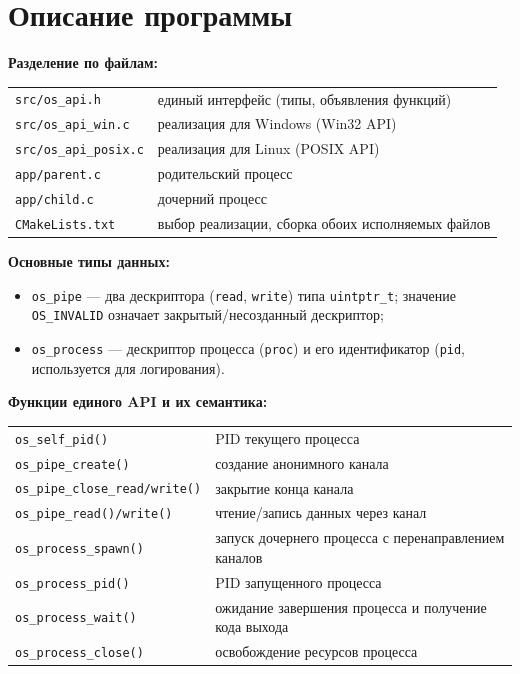 \section{Описание программы}

\textbf{Разделение по файлам:}

\begin{center}
\begin{tabular}{ll}
\texttt{src/os\_api.h}       & единый интерфейс (типы, объявления функций) \\
\texttt{src/os\_api\_win.c}  & реализация для Windows (Win32 API) \\
\texttt{src/os\_api\_posix.c}& реализация для Linux (POSIX API) \\
\texttt{app/parent.c}        & родительский процесс \\
\texttt{app/child.c}         & дочерний процесс \\
\texttt{CMakeLists.txt}      & выбор реализации, сборка обоих исполняемых файлов \\
\end{tabular}
\end{center}

\textbf{Основные типы данных:}
\begin{itemize}
  \item \texttt{os\_pipe} --- два дескриптора (\texttt{read}, \texttt{write}) типа
    \texttt{uintptr\_t}; значение \texttt{OS\_INVALID} означает закрытый/несозданный дескриптор;
  \item \texttt{os\_process} --- дескриптор процесса (\texttt{proc}) и его идентификатор
    (\texttt{pid}, используется для логирования).
\end{itemize}

\textbf{Функции единого API и их семантика:}

\begin{center}
\begin{tabular}{ll}
\texttt{os\_self\_pid()}               & PID текущего процесса \\
\texttt{os\_pipe\_create()}           & создание анонимного канала \\
\texttt{os\_pipe\_close\_read/write()} & закрытие конца канала \\
\texttt{os\_pipe\_read()/write()}      & чтение/запись данных через канал \\
\texttt{os\_process\_spawn()}         & запуск дочернего процесса с перенаправлением каналов \\
\texttt{os\_process\_pid()}           & PID запущенного процесса \\
\texttt{os\_process\_wait()}          & ожидание завершения процесса и получение кода выхода \\
\texttt{os\_process\_close()}         & освобождение ресурсов процесса \\
\end{tabular}
\end{center}

